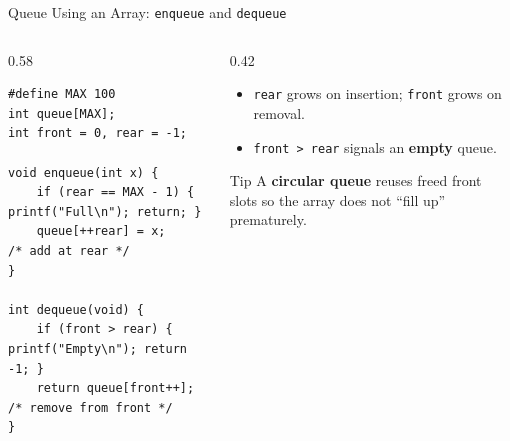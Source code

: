 \documentclass[aspectratio=169]{beamer}
\begin{document}
	\begin{frame}[fragile]{Queue Using an Array: \texttt{enqueue} and \texttt{dequeue}}
		\begin{columns}[T]
			\begin{column}{0.58\textwidth}
				\begin{lstlisting}
#define MAX 100
int queue[MAX];
int front = 0, rear = -1;

void enqueue(int x) {
    if (rear == MAX - 1) { printf("Full\n"); return; }
    queue[++rear] = x;      /* add at rear */
}

int dequeue(void) {
    if (front > rear) { printf("Empty\n"); return -1; }
    return queue[front++];  /* remove from front */
}
				\end{lstlisting}
			\end{column}
			\begin{column}{0.42\textwidth}
				\begin{itemize}\small
					\item \texttt{rear} grows on insertion; \texttt{front} grows on removal.
					\item \texttt{front > rear} signals an \textbf{empty} queue.
				\end{itemize}
				\begin{block}{Tip}
					\small A \textbf{circular queue} reuses freed front slots so the array does not ``fill up'' prematurely.
				\end{block}
			\end{column}
		\end{columns}
	\end{frame}

\end{document}
